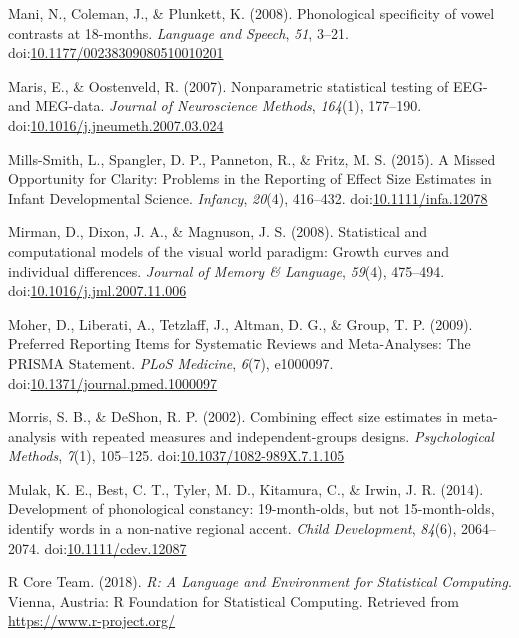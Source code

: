 \documentclass[man]{apa6}
\theoremstyle{definition}
\theoremstyle{definition}
\theoremstyle{definition}
\theoremstyle{remark}
\begin{document}
\hypertarget{ref-Mani2008}{}
Mani, N., Coleman, J., \& Plunkett, K. (2008). Phonological specificity
of vowel contrasts at 18-months. \emph{Language and Speech}, \emph{51},
3--21.
doi:\href{https://doi.org/10.1177/00238309080510010201}{10.1177/00238309080510010201}

\hypertarget{ref-Maris2007}{}
Maris, E., \& Oostenveld, R. (2007). Nonparametric statistical testing
of EEG- and MEG-data. \emph{Journal of Neuroscience Methods},
\emph{164}(1), 177--190.
doi:\href{https://doi.org/10.1016/j.jneumeth.2007.03.024}{10.1016/j.jneumeth.2007.03.024}

\hypertarget{ref-Mills-Smith2015}{}
Mills-Smith, L., Spangler, D. P., Panneton, R., \& Fritz, M. S. (2015).
A Missed Opportunity for Clarity: Problems in the Reporting of Effect
Size Estimates in Infant Developmental Science. \emph{Infancy},
\emph{20}(4), 416--432.
doi:\href{https://doi.org/10.1111/infa.12078}{10.1111/infa.12078}

\hypertarget{ref-Mirman2008}{}
Mirman, D., Dixon, J. A., \& Magnuson, J. S. (2008). Statistical and
computational models of the visual world paradigm: Growth curves and
individual differences. \emph{Journal of Memory \& Language},
\emph{59}(4), 475--494.
doi:\href{https://doi.org/10.1016/j.jml.2007.11.006}{10.1016/j.jml.2007.11.006}

\hypertarget{ref-Moher2009}{}
Moher, D., Liberati, A., Tetzlaff, J., Altman, D. G., \& Group, T. P.
(2009). Preferred Reporting Items for Systematic Reviews and
Meta-Analyses: The PRISMA Statement. \emph{PLoS Medicine}, \emph{6}(7),
e1000097.
doi:\href{https://doi.org/10.1371/journal.pmed.1000097}{10.1371/journal.pmed.1000097}

\hypertarget{ref-morris2002combining}{}
Morris, S. B., \& DeShon, R. P. (2002). Combining effect size estimates
in meta-analysis with repeated measures and independent-groups designs.
\emph{Psychological Methods}, \emph{7}(1), 105--125.
doi:\href{https://doi.org/10.1037/1082-989X.7.1.105}{10.1037/1082-989X.7.1.105}

\hypertarget{ref-Mulak2014}{}
Mulak, K. E., Best, C. T., Tyler, M. D., Kitamura, C., \& Irwin, J. R.
(2014). Development of phonological constancy: 19-month-olds, but not
15-month-olds, identify words in a non-native regional accent.
\emph{Child Development}, \emph{84}(6), 2064--2074.
doi:\href{https://doi.org/10.1111/cdev.12087}{10.1111/cdev.12087}

\hypertarget{ref-R}{}
R Core Team. (2018). \emph{R: A Language and Environment for Statistical
Computing}. Vienna, Austria: R Foundation for Statistical Computing.
Retrieved from \url{https://www.r-project.org/}
\end{document}
